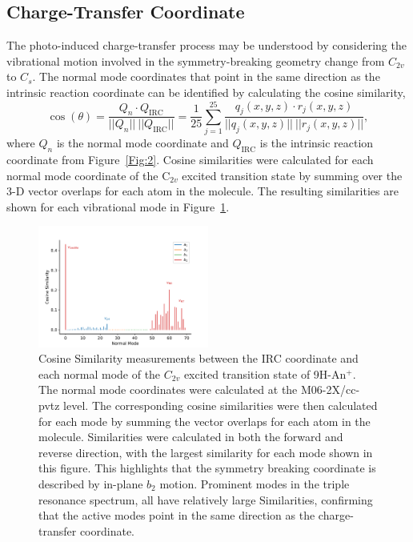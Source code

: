 \documentclass[journal=jpcafh,manuscript=article,layout=onecolumn, 12pt]{achemso}
\begin{document}
\subsection{Charge-Transfer Coordinate}
The photo-induced charge-transfer process may be understood by considering the vibrational motion involved in the symmetry-breaking geometry change from $C_{2v}$ to $C_s$. The normal mode coordinates that point in the same direction as the intrinsic reaction coordinate can be identified by calculating the cosine similarity,
\begin{equation}
	\cos(\theta) = \frac{Q_n\cdot Q_{\text{IRC}}}{||Q_n||~||Q_{\text{IRC}}||} = \frac{1}{25} \displaystyle\sum_{j=1}^{25}\frac{q_j(x,y,z)\cdot r_j(x,y,z)}{||q_j(x,y,z)||~||r_j(x,y,z)||},
\end{equation}
where $Q_n$ is the normal mode coordinate and $Q_{\text{IRC}}$ is the intrinsic reaction coordinate from Figure~\ref{Fig:2}. Cosine similarities were calculated for each normal mode coordinate of the C$_{2v}$ excited transition state by summing over the 3-D vector overlaps for each atom in the molecule. The resulting similarities are shown for each vibrational mode in Figure~\ref{Fig:5}.

\begin{figure} [h]
	\includegraphics[width=0.5\textwidth]{figures/MFigure5}
	\caption{Cosine Similarity measurements between the IRC coordinate and each normal mode of the $C_{2v}$ excited transition state of 9H-An$^+$. The normal mode coordinates were calculated at the M06-2X/cc-pvtz level. The corresponding cosine similarities were then calculated for each mode by summing the vector overlaps for each atom in the molecule. Similarities were calculated in both the forward and reverse direction, with the largest similarity for each mode shown in this figure. This highlights that the symmetry breaking coordinate is described by in-plane $b_2$ motion. Prominent modes in the triple resonance spectrum, all have relatively large Similarities, confirming that the active modes point in the same direction as the charge-transfer coordinate.}
	\label{Fig:5}
\end{figure}
\end{document}
